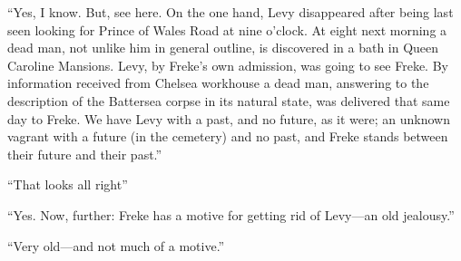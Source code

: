 “Yes, I know. But, see here. On the one hand, Levy disappeared after being last seen looking for Prince of Wales Road at nine o’clock. At eight next morning a dead man, not unlike him in general outline, is discovered in a bath in Queen Caroline Mansions. Levy, by Freke’s own admission, was going to see Freke. By information received from Chelsea workhouse a dead man, answering to the description of the Battersea corpse in its natural state, was delivered that same day to Freke. We have Levy with a past, and no future, as it were; an unknown vagrant with a future (in the cemetery) and no past, and Freke stands between their future and their past.”

\enquote{That looks all right\longdash}

\enquote{Yes. Now, further: Freke has a motive for getting rid of Levy\allowbreak---\allowbreak an old jealousy.}

\enquote{Very old\allowbreak---\allowbreak and not much of a motive.}

